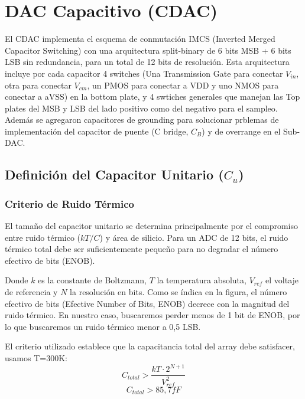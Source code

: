 \documentclass[12pt,a4paper]{report}
\begin{document}
\newpage
\section{DAC Capacitivo (CDAC)}

El CDAC implementa el esquema de conmutación IMCS (Inverted Merged Capacitor Switching) con una arquitectura split-binary de 6 bits MSB + 6 bits LSB sin redundancia, para un total de 12 bits de resolución.
Esta arquitectura incluye por cada capacitor 4 switches (Una Transmission Gate para conectar $V_{in}$, otra para conectar $V_{cm}$, un PMOS para conectar a VDD y uno NMOS para conectar a aVSS) en la bottom plate, y 4 swtiches generales que manejan las Top plates del MSB y LSB del lado positivo como del negativo para el sampleo.
Además se agregaron capacitores de grounding para solucionar prblemas de implementación del capacitor de puente (C bridge, $C_B$) y de overrange en el Sub-DAC\cite{chang_sar_thesis}.

\subsection{Definición del Capacitor Unitario ($C_u$)}

\subsubsection{Criterio de Ruido Térmico}

El tamaño del capacitor unitario se determina principalmente por el compromiso entre ruido térmico ($kT/C$) y área de silicio. Para un ADC de 12 bits, el ruido térmico total debe ser suficientemente pequeño para no degradar el número efectivo de bits (ENOB).



Donde $k$ es la constante de Boltzmann, $T$ la temperatura absoluta, $V_{ref}$ el voltaje de referencia y $N$ la resolución en bits.
Como se índica en la figura, el número efectivo de bits (Efective Number of Bits, ENOB) decrece con la magnitud del ruido térmico. En nuestro caso, buscaremos perder menos de 1 bit de ENOB, por lo que buscaremos un ruido térmico menor a 0,5 LSB.



El criterio utilizado establece que la capacitancia total del array debe satisfacer, usamos T=300K:
\begin{equation}
C_{total} > \frac{kT\cdot 2^{N+1}}{V_{ref}^2 }
\end{equation}
\begin{equation}
C_{total} >  85,7fF
\end{equation}
\end{document}
